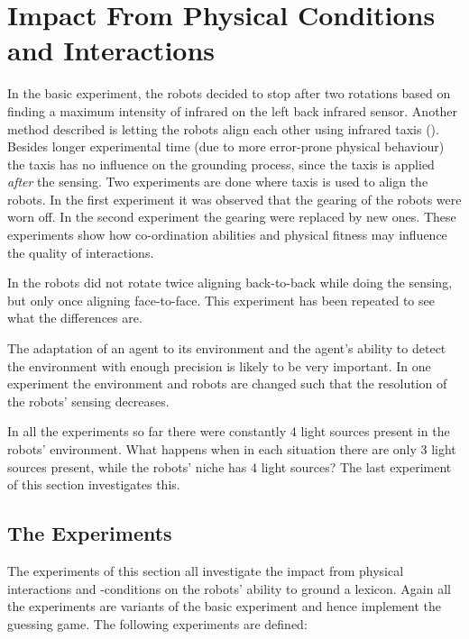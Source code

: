 \section{Impact From Physical Conditions and Interactions}\label{s:par:int}


In the basic experiment, the robots decided to stop after two rotations based on finding a maximum intensity of infrared on the left back infrared sensor. Another method described is letting the robots align each other using infrared taxis (). Besides longer experimental time (due to more error-prone physical behaviour) the taxis has no influence on the grounding process, since the taxis is applied {\em after} the sensing. Two experiments are done where taxis is used to align the robots. In the first experiment it was observed that the gearing of the robots were worn off. In the second experiment the gearing were replaced by new ones. These experiments show how co-ordination abilities and physical fitness may influence the quality of interactions.

In \citep{steelsvogt:1997} the robots did not rotate twice aligning back-to-back while doing the sensing, but only once aligning face-to-face. This experiment has been repeated to see what the differences are.

The adaptation of an agent to its environment and the agent's ability to detect the environment with enough precision is likely to be very important. In one experiment the environment and robots are changed such that the resolution of the robots' sensing decreases.

In all the experiments so far there were constantly 4 light sources present in the robots' environment. What happens when in each situation there are only 3 light sources present, while the robots' niche has 4 light sources? The last experiment of this section investigates this.

\subsection{The Experiments}

The experiments of this section all investigate the impact from physical interactions and -conditions on the robots' ability to ground a lexicon. Again all the experiments are variants of the basic experiment and hence implement the guessing game. The following experiments are defined:

